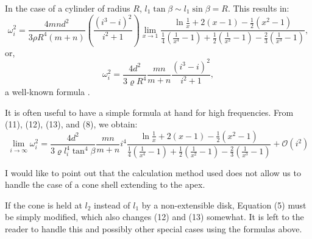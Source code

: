 \documentclass[11pt]{amsart}
\begin{document}
In the case of a cylinder of radius \(R\), \(l_1 \tan \beta \sim l_1 \sin
\beta=R\).  This results in:
\begin{equation}
\omega_i^2=\frac{4 m n d^2}{3 \rho R^4(m+n)}
\left(\frac{\left(i^3-i\right)^2}{i^2+1}\right) \lim_{x \rightarrow 1} \frac{\ln \frac{1}{x}+2(x-1)-\frac{1}{2}\left(x^2-1\right)}{\frac{1}{4}\left(\frac{1}{x^4}-1\right)+\frac{1}{2}\left(\frac{1}{x^2}-1\right)-\frac{2}{3}\left(\frac{1}{x^3}-1\right)},
\end{equation}
or,
\[
\omega_i^2=\frac{4 d^2}{3 \varrho R^4} \frac{m n}{m+n} \frac{\left(i^3-i\right)^2}{i^2+1},
\]
a well-known formula \cite[p 417 Eq 18]{rayleigh_sound_v1_1945}.

It is often useful to have a simple formula at hand for high frequencies. From
(11), (12), (13), and (8), we obtain:
\[
\lim_{i \rightarrow \infty} \omega_i^2=\frac{4 d^2}{3 \varrho l_i^4 \tan^4 \beta} \frac{m n}{m+n}
i^4 \frac{\ln \frac{1}{x}+2(x-1)-\frac{1}{2}\left(x^2-1\right)}{\frac{1}{4}\left(\frac{1}{x^4}-1\right)+\frac{1}{2}\left(\frac{1}{x^2}-1\right)-\frac{2}{3}\left(\frac{1}{x^3}-1\right)}
+ \mathcal{O}(i^2)
\]

I would like to point out that the calculation method used does not allow us to
handle the case of a cone shell extending to the apex.

If the cone is held at \(l_2\) instead of \(l_1\) by a non-extensible disk,
Equation (5) must be simply modified, which also changes (12) and (13)
somewhat. It is left to the reader to handle this and possibly other special
cases using the formulas above.

\printbibliography[heading=bibintoc,title={References}]
\end{document}
